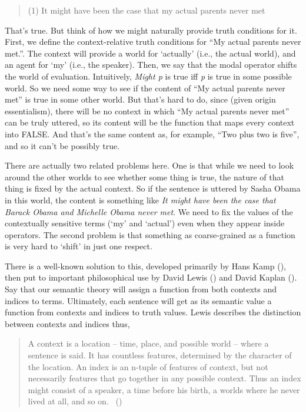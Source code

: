 \documentclass[
  10pt,
  letterpaper,
  DIV=11,
  numbers=noendperiod,
  twoside]{scrartcl}
\begin{document}
\begin{quote}
(1) It might have been the case that my actual parents never met
\end{quote}

That's true. But think of how we might naturally provide truth
conditions for it. First, we define the context-relative truth
conditions for ``My actual parents never met.''. The context will
provide a world for `actually' (i.e., the actual world), and an agent
for `my' (i.e., the speaker). Then, we say that the modal operator
shifts the world of evaluation. Intuitively, \emph{Might p} is true iff
\emph{p} is true in some possible world. So we need some way to see if
the content of ``My actual parents never met'' is true in some other
world. But that's hard to do, since (given origin essentialism), there
will be no context in which ``My actual parents never met'' can be truly
uttered, so its content will be the function that maps every context
into FALSE. And that's the same content as, for example, ``Two plus two
is five'', and so it can't be possibly true.

There are actually two related problems here. One is that while we need
to look around the other worlds to see whether some thing is true, the
nature of that thing is fixed by the actual context. So if the sentence
is uttered by Sasha Obama in this world, the content is something like
\emph{It might have been the case that Barack Obama and Michelle Obama
never met}. We need to fix the values of the contextually sensitive
terms (`my' and `actual') even when they appear inside operators. The
second problem is that something as coarse-grained as a function is very
hard to `shift' in just one respect.

There is a well-known solution to this, developed primarily by Hans Kamp
(), then put to important philosophical use
by David Lewis () and David Kaplan
(). Say that our semantic theory will
assign a function from both contexts and indices to terms. Ultimately,
each sentence will get as its semantic value a function from contexts
and indices to truth values. Lewis describes the distinction between
contexts and indices thus,

\begin{quote}
A context is a location -- time, place, and possible world -- where a
sentence is said. It has countless features, determined by the character
of the location. An index is an n-tuple of features of context, but not
necessarily features that go together in any possible context. Thus an
index might consist of a speaker, a time before his birth, a worlds
where he never lived at all, and so on.
~()
\end{quote}
\end{document}
